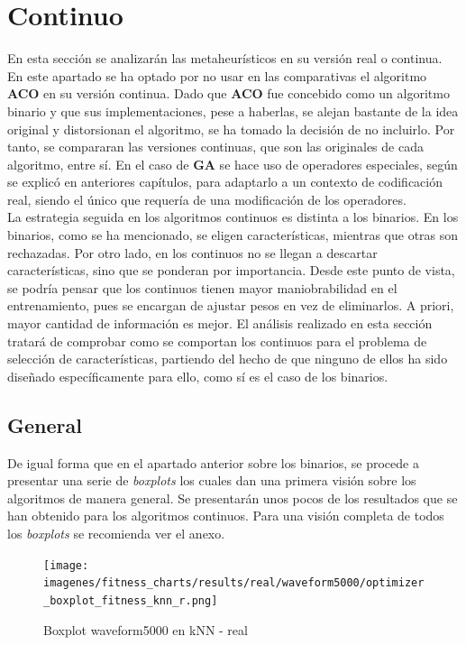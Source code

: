 \section{Continuo}
En esta sección se analizarán las metaheurísticos en su versión real o continua. En este apartado se ha optado por no usar en las comparativas el algoritmo \textbf{ACO} en su versión continua. Dado que \textbf{ACO} fue concebido como un algoritmo binario y que sus implementaciones, pese a haberlas, se alejan bastante de la idea original y distorsionan el algoritmo, se ha tomado la decisión de no incluirlo. Por tanto, se compararan las versiones continuas, que son las originales de cada algoritmo, entre sí. En el caso de \textbf{GA} se hace uso de operadores especiales, según se explicó en anteriores capítulos, para adaptarlo a un contexto de codificación real, siendo el único que requería de una modificación de los operadores.\\[6pt]
La estrategia seguida en los algoritmos continuos es distinta a los binarios. En los binarios, como se ha mencionado, se eligen características, mientras que otras son rechazadas. Por otro lado, en los continuos no se llegan a descartar características, sino que se ponderan por importancia. Desde este punto de vista, se podría pensar que los continuos tienen mayor maniobrabilidad en el entrenamiento, pues se encargan de ajustar pesos en vez de eliminarlos. A priori, mayor cantidad de información es mejor. El análisis realizado en esta sección tratará de comprobar como se comportan los continuos para el problema de selección de características, partiendo del hecho de que ninguno de ellos ha sido diseñado específicamente para ello, como sí es el caso de los binarios.

\subsection{General}
De igual forma que en el apartado anterior sobre los binarios, se procede a presentar una serie de \textit{boxplots} los cuales dan una primera visión sobre los algoritmos de manera general. Se presentarán unos pocos de los resultados que se han obtenido para los algoritmos continuos. Para una visión completa de todos los \textit{boxplots} se recomienda ver el anexo.

\begin{figure}[htp]
    \centering
    \texttt{[image: imagenes/fitness\_charts/results/real/waveform5000/optimizer\_boxplot\_fitness\_knn\_r.png]}
    \caption{Boxplot waveform5000 en kNN - real}
    \label{fig:boxplot_waveform5000}
\end{figure}

